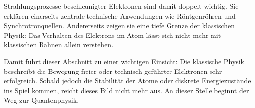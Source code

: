 Strahlungsprozesse beschleunigter Elektronen sind damit doppelt wichtig. Sie
erklären einerseits zentrale technische Anwendungen wie Röntgenröhren und
Synchrotronquellen. Andererseits zeigen sie eine tiefe Grenze der klassischen
Physik: Das Verhalten des Elektrons im Atom lässt sich nicht mehr mit
klassischen Bahnen allein verstehen.

Damit führt dieser Abschnitt zu einer wichtigen Einsicht: Die klassische Physik
beschreibt die Bewegung freier oder technisch geführter Elektronen sehr
erfolgreich. Sobald jedoch die Stabilität der Atome oder diskrete
Energiezustände ins Spiel kommen, reicht dieses Bild nicht mehr aus. An dieser
Stelle beginnt der Weg zur Quantenphysik.